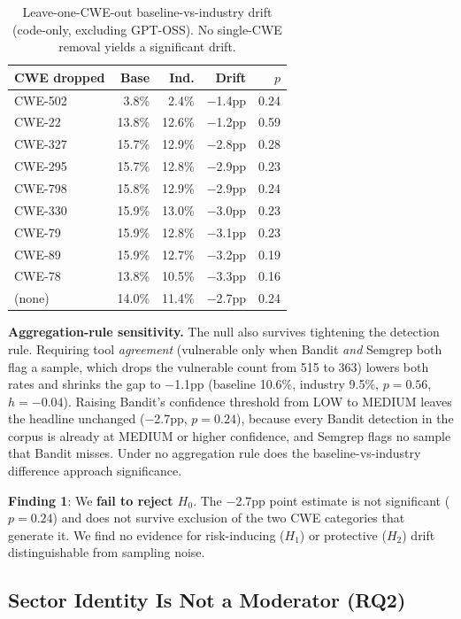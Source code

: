 \documentclass[sigconf,review,anonymous]{acmart}
\begin{document}
\begin{table}[t]
\caption{Leave-one-CWE-out baseline-vs-industry drift (code-only, excluding GPT-OSS). No single-CWE removal yields a significant drift.}
\label{tab:loo}
\centering
\footnotesize
\begin{tabular}{lrrrr}
\toprule
\textbf{CWE dropped} & \textbf{Base} & \textbf{Ind.} & \textbf{Drift} & \textbf{$p$} \\
\midrule
CWE-502 & 3.8\% & 2.4\% & $-$1.4pp & 0.24 \\
CWE-22 & 13.8\% & 12.6\% & $-$1.2pp & 0.59 \\
CWE-327 & 15.7\% & 12.9\% & $-$2.8pp & 0.28 \\
CWE-295 & 15.7\% & 12.8\% & $-$2.9pp & 0.23 \\
CWE-798 & 15.8\% & 12.9\% & $-$2.9pp & 0.24 \\
CWE-330 & 15.9\% & 13.0\% & $-$3.0pp & 0.23 \\
CWE-79 & 15.9\% & 12.8\% & $-$3.1pp & 0.23 \\
CWE-89 & 15.9\% & 12.7\% & $-$3.2pp & 0.19 \\
CWE-78 & 13.8\% & 10.5\% & $-$3.3pp & 0.16 \\
\midrule
(none) & 14.0\% & 11.4\% & $-$2.7pp & 0.24 \\
\bottomrule
\end{tabular}
\end{table}

\textbf{Aggregation-rule sensitivity.} The null also survives tightening the detection rule. Requiring tool \emph{agreement} (vulnerable only when Bandit \emph{and} Semgrep both flag a sample, which drops the vulnerable count from 515 to 363) lowers both rates and shrinks the gap to $-$1.1pp (baseline 10.6\%, industry 9.5\%, $p=0.56$, $h=-0.04$). Raising Bandit's confidence threshold from LOW to MEDIUM leaves the headline unchanged ($-$2.7pp, $p=0.24$), because every Bandit detection in the corpus is already at MEDIUM or higher confidence, and Semgrep flags no sample that Bandit misses. Under no aggregation rule does the baseline-vs-industry difference approach significance.

\textbf{Finding 1}: We \textbf{fail to reject $H_0$}. The $-$2.7pp point estimate is not significant ($p=0.24$) and does not survive exclusion of the two CWE categories that generate it. We find no evidence for risk-inducing ($H_1$) or protective ($H_2$) drift distinguishable from sampling noise.

\subsection{Sector Identity Is Not a Moderator (RQ2)}
\end{document}
